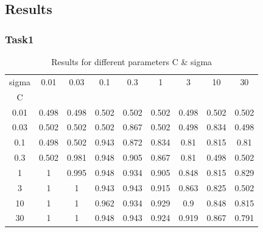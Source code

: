 \documentclass[UTF-8, a4paper, 10pt]{article}
\numberwithin{equation}{section}
\begin{document}
\newpage
\subsection{Results}
\subsubsection{Task1}
\begin{table}[htbp]
  \centering
  \caption{Results for different parameters C \& sigma}
    \begin{tabular}{ccccccccc}
    \toprule
    sigma & 0.01  & 0.03  & 0.1   & 0.3   & 1     & 3     & 10    & 30 \\
    C     &       &       &       &       &       &       &       &  \\
    \midrule
    0.01  & 0.498 & 0.498 & 0.502 & 0.502 & 0.502 & 0.498 & 0.502 & 0.502 \\
    0.03  & 0.502 & 0.502 & 0.502 & 0.867 & 0.502 & 0.498 & 0.834 & 0.498 \\
    0.1   & 0.498 & 0.502 & 0.943 & 0.872 & 0.834 & 0.81  & 0.815 & 0.81 \\
    0.3   & 0.502 & 0.981 & 0.948 & 0.905 & 0.867 & 0.81  & 0.498 & 0.502 \\
    1     & 1     & 0.995 & 0.948 & 0.934 & 0.905 & 0.848 & 0.815 & 0.829 \\
    3     & 1     & 1     & 0.943 & 0.943 & 0.915 & 0.863 & 0.825 & 0.502 \\
    10    & 1     & 1     & 0.962 & 0.934 & 0.929 & 0.9   & 0.848 & 0.815 \\
    30    & 1     & 1     & 0.948 & 0.943 & 0.924 & 0.919 & 0.867 & 0.791 \\
    \bottomrule
    \end{tabular}%
  \label{tab:addlabel}%
\end{table}%
\end{document}
